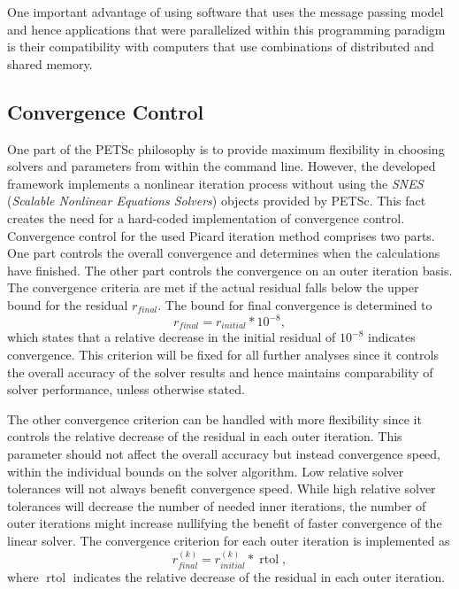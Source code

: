 One important advantage of using software that uses the message passing model and hence applications that were parallelized within this programming paradigm is their compatibility with computers that use combinations of distributed and shared memory.

\subsection{Convergence Control} 
\label{sec:convergence}
One part of the PETSc philosophy is to provide maximum flexibility in choosing solvers and parameters from within the command line. However, the developed framework implements a nonlinear iteration process without using the \emph{SNES} (\emph{Scalable Nonlinear Equations Solvers}) objects provided by PETSc. This fact creates the need for a hard-coded implementation of convergence control. Convergence control for the used Picard iteration method comprises two parts. One part controls the overall convergence and determines when the calculations have finished. The other part controls the convergence on an outer iteration basis. The convergence criteria are met if the actual residual falls below the upper bound for the residual \(r_{final}\). The bound for final convergence is determined to
\begin{displaymath}
  r_{final} = r_{initial} * 10^{-8},
\end{displaymath}
which states that a relative decrease in the initial residual of \(10^{-8}\) indicates convergence. This criterion will be fixed for all further analyses since it controls the overall accuracy of the solver results and hence maintains comparability of solver performance, unless otherwise stated. 

The other convergence criterion can be handled with more flexibility since it controls the relative decrease of the residual in each outer iteration. This parameter should not affect the overall accuracy but instead convergence speed, within the individual bounds on the solver algorithm. Low relative solver tolerances will not always benefit convergence speed. While high relative solver tolerances will decrease the number of needed inner iterations, the number of outer iterations might increase nullifying the benefit of faster convergence of the linear solver. The convergence criterion for each outer iteration is implemented as
\begin{displaymath}
  r_{final}^{(k)} = r_{initial}^{(k)} * \operatorname{rtol},
\end{displaymath}
where \(\operatorname{rtol}\) indicates the relative decrease of the residual in each outer iteration. 

